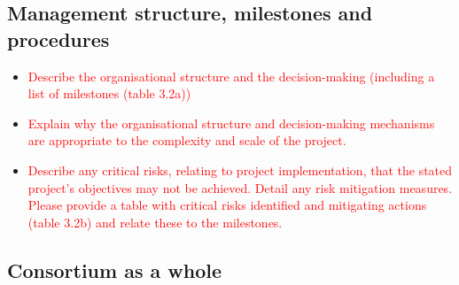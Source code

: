 \documentclass[11pt, a4paper]{article} %
\begin{document}

  
  \subsection{Management structure, milestones and procedures}
  \begin{itemize}
  \item \textcolor{red}{Describe the organisational structure and the
      decision-making (including a list of milestones (table 3.2a))}
\item \textcolor{red}{Explain why the organisational structure and
  decision-making mechanisms are appropriate to the complexity and
  scale of the project.}
\item \textcolor{red}{Describe any critical risks, relating to project
    implementation, that the stated project's objectives may not be
    achieved. Detail any risk mitigation measures. Please provide a
    table with critical risks identified and mitigating actions (table
    3.2b) and relate these to the milestones.}
  \end{itemize}


  
  \subsection{Consortium as a whole}
\end{document}
